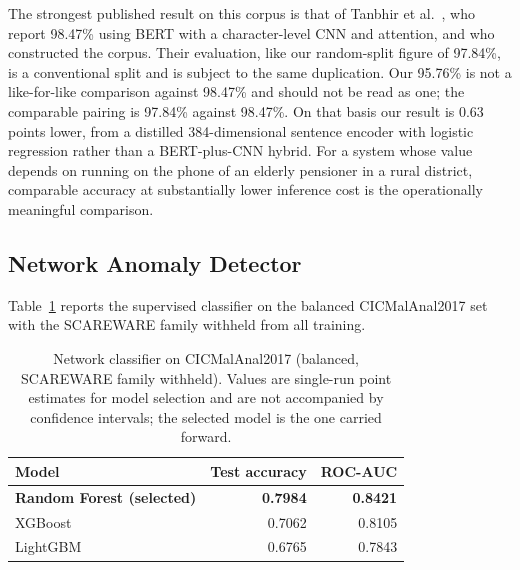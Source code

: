 \documentclass[preprint,12pt,number]{elsarticle}
\begin{document}
The strongest published result on this corpus is that of Tanbhir et al.~\cite{tanbhir2024}, who report 98.47\% using BERT with a character-level CNN and attention, and who constructed the corpus. Their evaluation, like our random-split figure of 97.84\%, is a conventional split and is subject to the same duplication. Our 95.76\% is not a like-for-like comparison against 98.47\% and should not be read as one; the comparable pairing is 97.84\% against 98.47\%. On that basis our result is 0.63 points lower, from a distilled 384-dimensional sentence encoder with logistic regression rather than a BERT-plus-CNN hybrid. For a system whose value depends on running on the phone of an elderly pensioner in a rural district, comparable accuracy at substantially lower inference cost is the operationally meaningful comparison.

\subsection{Network Anomaly Detector}
Table~\ref{tab:net} reports the supervised classifier on the balanced CICMalAnal2017 set with the SCAREWARE family withheld from all training.

\begin{table}[t]
\centering
\caption{Network classifier on CICMalAnal2017 (balanced, SCAREWARE family withheld). Values are single-run point estimates for model selection and are not accompanied by confidence intervals; the selected model is the one carried forward.}
\label{tab:net}
\small
\begin{tabular}{lrr}
\toprule
Model & Test accuracy & ROC-AUC \\
\midrule
\textbf{Random Forest (selected)} & \textbf{0.7984} & \textbf{0.8421} \\
XGBoost & 0.7062 & 0.8105 \\
LightGBM & 0.6765 & 0.7843 \\
\bottomrule
\end{tabular}
\end{table}
\end{document}
